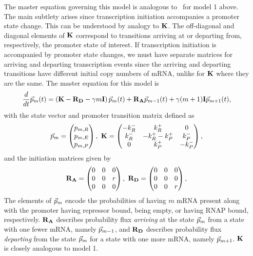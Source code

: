 The master equation governing this model is analogous
to~ for model 1 above. The
main subtlety arises since transcription initiation accompanies a promoter state
change. This can be understood by analogy to $\mathbf{K}$. The off-diagonal and
diagonal elements of $\mathbf{K}$ correspond to transitions arriving at or departing from,
respectively, the promoter state of interest. If transcription initiation is 
accompanied by promoter state changes, we must have separate matrices for
arriving and departing transcription events since the arriving and departing
transitions have different initial copy numbers of mRNA, unlike for $\mathbf{K}$
where they are the same. The master equation for this model is
\begin{equation}
\frac{d {}}{d t}\vec{p}_m(t) =
\left( \mathbf{K} - \mathbf{R_D} - \gamma m \mathbf{I} \right) \vec{p}_m(t)
                + \mathbf{R_A} \vec{p}_{m-1}(t) +
                \gamma (m+1) \mathbf{I} \vec{p}_{m+1}(t),
\label{eq:3state_rep_cme}
\end{equation}
with the state vector and promoter transition matrix defined as
\begin{equation}
\vec{p}_m = \begin{pmatrix} p_{m,R} \\ p_{m,E} \\ p_{m,P} \end{pmatrix},\
\mathbf{K} = \begin{pmatrix} -k_R^- & k_R^+ & 0 \\
                        k_R^- & -k_R^+ -k_P^+ & k_P^- \\
                        0 & k_P^+ & -k_P^- 
                \end{pmatrix},
\label{eq:3state_cme_matrices_pt1}
\end{equation}
and the initiation matrices given by
\begin{equation}
\mathbf{R_A} = \begin{pmatrix}
                0 & 0 & 0 \\ 0 & 0 & r \\ 0 & 0 & 0
                \end{pmatrix},\
\mathbf{R_D} = \begin{pmatrix}
                0 & 0 & 0 \\ 0 & 0 & 0 \\ 0 & 0 & r
                \end{pmatrix},
\label{eq:3state_cme_matrices_pt2}
\end{equation}
The elements of $\vec{p}_m$ encode the probabilities of having $m$ mRNA present
along with the promoter having repressor bound, being empty, or having RNAP
bound, respectively. $\mathbf{R_A}$ describes probability flux \textit{arriving}
at the state $\vec{p}_m$ from a state with one fewer mRNA, namely
$\vec{p}_{m-1}$, and $\mathbf{R_D}$ describes probability flux \textit{departing}
from the state $\vec{p}_m$ for a state with one more mRNA, namely
$\vec{p}_{m+1}$. $\mathbf{K}$ is closely analogous to model 1.

